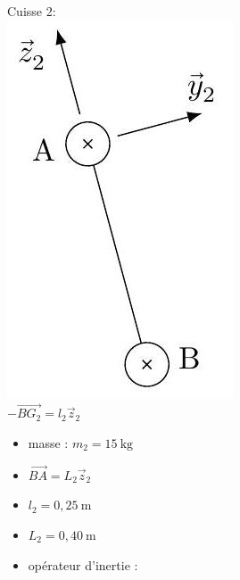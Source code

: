 \documentclass[10pt]{article}
\begin{document}
Cuisse 2:\\
\includegraphics[max width=\textwidth, center]{2025_07_03_97545f5dc188959e5663g-13(1)}\\
$-\overrightarrow{B G_{2}}=l_{2} \vec{z}_{2}$

\begin{itemize}
  \item masse : $m_{2}=15 \mathrm{~kg}$
  \item $\overrightarrow{B A}=L_{2} \vec{z}_{2}$
  \item $l_{2}=0,25 \mathrm{~m}$
  \item $L_{2}=0,40 \mathrm{~m}$
  \item opérateur d'inertie :
\end{itemize}
\end{document}
